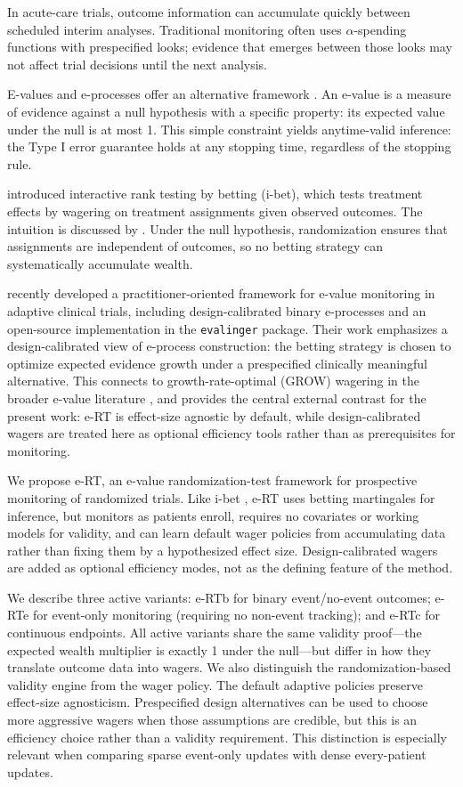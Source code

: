 \documentclass[10pt]{article}
\begin{document}
In acute-care trials, outcome information can accumulate quickly between scheduled interim analyses. Traditional monitoring often uses $\alpha$-spending functions with prespecified looks; evidence that emerges between those looks may not affect trial decisions until the next analysis.

E-values and e-processes offer an alternative framework \citep{shafer2021, vovk2021, ramdas2025}. An e-value is a measure of evidence against a null hypothesis with a specific property: its expected value under the null is at most 1. This simple constraint yields anytime-valid inference: the Type I error guarantee holds at any stopping time, regardless of the stopping rule.

\citet{pmlr-v177-duan22a} introduced interactive rank testing by betting (i-bet), which tests treatment effects by wagering on treatment assignments given observed outcomes. The intuition is discussed by \cite{ramdas2021game}. Under the null hypothesis, randomization ensures that assignments are independent of outcomes, so no betting strategy can systematically accumulate wealth.

\citet{sokolova2026evalues} recently developed a practitioner-oriented framework for e-value monitoring in adaptive clinical trials, including design-calibrated binary e-processes and an open-source implementation in the \texttt{evalinger} package. Their work emphasizes a design-calibrated view of e-process construction: the betting strategy is chosen to optimize expected evidence growth under a prespecified clinically meaningful alternative. This connects to growth-rate-optimal (GROW) wagering in the broader e-value literature \citep{ramdas2025}, and provides the central external contrast for the present work: e-RT is effect-size agnostic by default, while design-calibrated wagers are treated here as optional efficiency tools rather than as prerequisites for monitoring.

We propose e-RT, an e-value randomization-test framework for prospective monitoring of randomized trials. Like i-bet \citep{pmlr-v177-duan22a}, e-RT uses betting martingales for inference, but monitors as patients enroll, requires no covariates or working models for validity, and can learn default wager policies from accumulating data rather than fixing them by a hypothesized effect size. Design-calibrated wagers are added as optional efficiency modes, not as the defining feature of the method.

We describe three active variants: e-RTb for binary event/no-event outcomes; e-RTe for event-only monitoring (requiring no non-event tracking); and e-RTc for continuous endpoints. All active variants share the same validity proof---the expected wealth multiplier is exactly 1 under the null---but differ in how they translate outcome data into wagers. We also distinguish the randomization-based validity engine from the wager policy. The default adaptive policies preserve effect-size agnosticism. Prespecified design alternatives can be used to choose more aggressive wagers when those assumptions are credible, but this is an efficiency choice rather than a validity requirement. This distinction is especially relevant when comparing sparse event-only updates with dense every-patient updates.
\end{document}
